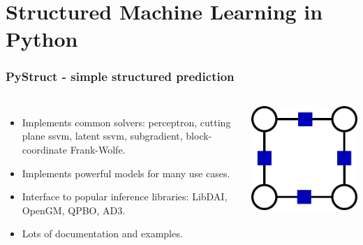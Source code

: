 \documentclass[final,ignorenonframetext,compress]{beamer}
\begin{document}
    \begin{frame}
    \end{frame}


    \section*{Structured Machine Learning in Python}
    \begin{frame}
        \frametitle{PyStruct - simple structured prediction}
        \begin{columns}
                \begin{itemize}
                    \item Implements common solvers: perceptron, cutting plane
                        ssvm, latent ssvm, subgradient, block-coordinate
                        Frank-Wolfe.
                    \item<2-> Implements powerful models for many use cases.
                    \item<3-> Interface to popular inference libraries: LibDAI, OpenGM, QPBO, AD3.
                    \item<4-> Lots of documentation and examples.
                \end{itemize}
            \begin{center}
                \includegraphics[width=.6\linewidth]{images/logo_pystruct}
            \end{center}
        \end{columns}
    \end{frame}
\end{document}

